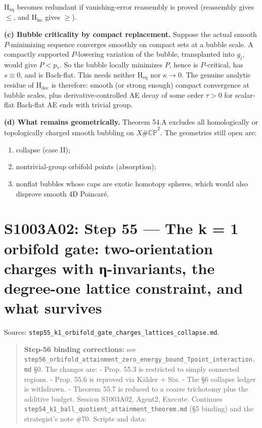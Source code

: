 \documentclass[
  10pt,
]{report}
\providecommand{\tightlist}{%
  \setlength{\itemsep}{0pt}\setlength{\parskip}{0pt}}
\begin{document}
\(\mathrm{H_{eq}}\) becomes redundant if vanishing-error reassembly is
proved (reassembly gives \(\le\), and \(\mathrm{H_{lsc}}\) gives
\(\ge\)).

\textbf{(c) Bubble criticality by compact replacement.} Suppose the
actual smooth \(P\)-minimizing sequence converges smoothly on compact
sets at a bubble scale. A compactly supported \(P\)-lowering variation
of the bubble, transplanted into \(g_i\), would give \(P<p_*\). So the
bubble locally minimizes \(P\), hence is \(P\)-critical, has
\(s\equiv0\), and is Bach-flat. This needs neither \(\mathrm{H_{eq}}\)
nor \(\kappa\to0\). The genuine analytic residue of \(\mathrm{H_{dec}}\)
is therefore: smooth (or strong enough) compact convergence at bubble
scales, plus derivative-controlled AE decay of some order \(\tau>0\) for
scalar-flat Bach-flat AE ends with trivial group.

\textbf{(d) What remains geometrically.} Theorem 54.A excludes all
homologically or topologically charged smooth bubbling on
\(X\#\overline{\mathbb{CP}}^2\). The geometries still open are:

\begin{enumerate}
\def\labelenumi{\arabic{enumi}.}
\tightlist
\item
  collapse (case II);
\item
  nontrivial-group orbifold points (absorption);
\item
  nonflat bubbles whose caps are exotic homotopy spheres, which would
  also disprove smooth 4D Poincaré.
\end{enumerate}

\hypertarget{s1003a02-step-55-the-k-1-orbifold-gate-two-orientation-charges-with-ux3b7-invariants-the-degree-one-lattice-constraint-and-what-survives}{%
\chapter{S1003A02: Step 55 --- The k = 1 orbifold gate: two-orientation
charges with η-invariants, the degree-one lattice constraint, and what
survives}\label{s1003a02-step-55-the-k-1-orbifold-gate-two-orientation-charges-with-ux3b7-invariants-the-degree-one-lattice-constraint-and-what-survives}}

Source:
\texttt{step55\_k1\_orbifold\_gate\_charges\_lattices\_collapse.md}.

\begin{quote}
\textbf{Step-56 binding corrections:} see
\texttt{step56\_orbifold\_attainment\_zero\_energy\_bound\_Tpoint\_interaction.md}
§0. The changes are: - Prop. 55.3 is restricted to simply connected
regions. - Prop. 55.6 is reproved via Kähler + Siu. - The §6 collapse
ledger is withdrawn. - Theorem 55.7 is reduced to a coarse trichotomy
plus the additive budget. Session S1003A02, Agent2, Execute. Continues
\texttt{step54\_k1\_ball\_quotient\_attainment\_theorem.md} (§5 binding)
and the strategist's note \#70. Scripts and data:
\end{quote}
\end{document}
